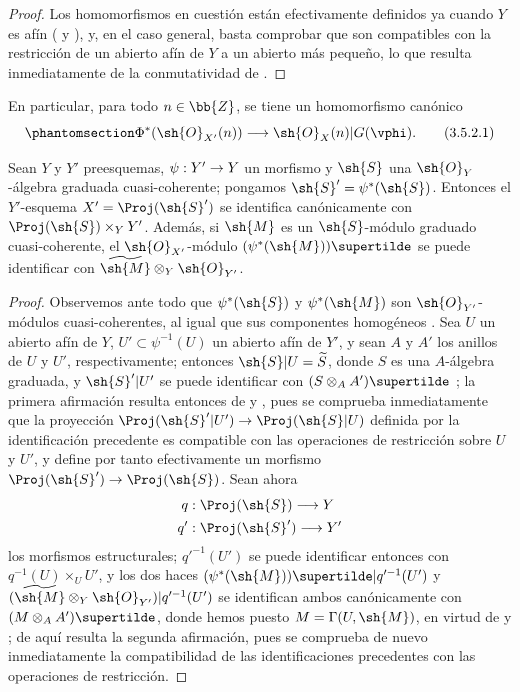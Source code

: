 \documentclass[oneside,10pt]{amsart}
\makeatletter
\newcommand{\ega@arrow}[2]{\mathchoice{#1}{#2}{#2}{#2}}
\renewcommand{\to}{\ega@arrow{\longrightarrow}{\rightarrow}}
\let\EGAOriginalLabel\label
\renewcommand{\label}[1]{\phantomsection\EGAOriginalLabel{#1}}
\makeatother
\begin{document}
\begin{proof}
Los homomorfismos en cuestión están efectivamente definidos ya cuando $Y$ es afín ( y ), y, en el caso general, basta comprobar que son compatibles con la restricción de un abierto afín de $Y$ a un abierto más pequeño, lo que resulta inmediatamente de la conmutatividad de .
\end{proof}

En particular, para todo $n\in\bb{Z}$, se tiene un homomorfismo canónico
\[
\label{II.3.5.2.1}
  \Phi^*(\sh{O}_{X'}(n))\to\sh{O}_X(n)|G(\vphi).
\tag{3.5.2.1}
\]

\begin{proposition}[3.5.3]
\label{II.3.5.3}
Sean $Y$ y $Y'$ preesquemas, $\psi:Y'\to Y$ un morfismo y $\sh{S}$ una $\sh{O}_Y$-álgebra graduada cuasi-coherente; pongamos $\sh{S}'=\psi^*(\sh{S})$.
Entonces el $Y'$-esquema $X'=\Proj(\sh{S}')$ se identifica canónicamente con $\Proj(\sh{S})\times_Y Y'$.
Además, si $\sh{M}$ es un $\sh{S}$-módulo graduado cuasi-coherente, el $\sh{O}_{X'}$-módulo $(\psi^*(\sh{M}))\supertilde$ se puede identificar con $\widetilde{\sh{M}}\otimes_Y\sh{O}_{Y'}$.
\end{proposition}

\begin{proof}
Observemos ante todo que $\psi^*(\sh{S})$ y $\psi^*(\sh{M})$ son $\sh{O}_{Y'}$-módulos cuasi-coherentes, al igual que sus componentes homogéneos .
Sea $U$ un abierto afín de $Y$, $U'\subset\psi^{-1}(U)$ un abierto afín de $Y'$, y sean $A$ y $A'$ los anillos de $U$ y $U'$, respectivamente; entonces $\sh{S}|U=\widetilde{S}$, donde $S$ es una $A$-álgebra graduada, y $\sh{S}'|U'$ se puede identificar con $(S\otimes_A A')\supertilde$ ; la primera afirmación resulta entonces de  y , pues se comprueba inmediatamente que la proyección $\Proj(\sh{S}'|U')\to\Proj(\sh{S}|U)$ definida por la identificación precedente es compatible con las operaciones de restricción sobre $U$ y $U'$, y define por tanto efectivamente un morfismo $\Proj(\sh{S}')\to\Proj(\sh{S})$.
Sean ahora
\begin{align*}
  q &: \Proj(\sh{S})\to Y
\\q'&: \Proj(\sh{S}')\to Y'
\end{align*}
los morfismos estructurales; $q'^{-1}(U')$ se puede identificar entonces con $q^{-1}(U)\times_U U'$, y los dos haces $(\psi^*(\sh{M}))\supertilde|q'^{-1}(U')$ y $(\widetilde{\sh{M}}\otimes_Y\sh{O}_{Y'})|q'^{-1}(U')$ se identifican ambos canónicamente con $(M\otimes_A A')\supertilde$, donde hemos puesto $M=\Gamma(U,\sh{M})$, en virtud de  y ; de aquí resulta la segunda afirmación, pues se comprueba de nuevo inmediatamente la compatibilidad de las identificaciones precedentes con las operaciones de restricción.
\end{proof}
\end{document}
